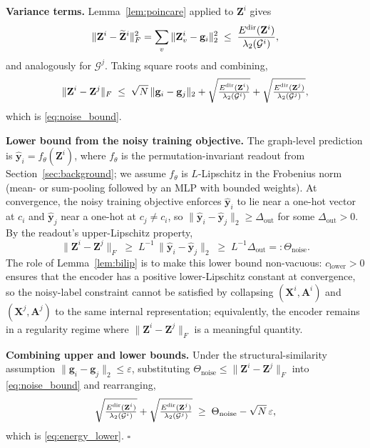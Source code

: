 \textbf{Variance terms.} Lemma~\ref{lem:poincare} applied to $\mathbf{Z}^i$ gives
\begin{equation}
\|\mathbf{Z}^i-\widetilde{\mathbf{Z}}^i\|_F^2=\sum_v\|\mathbf{Z}^i_v-\mathbf{g}_i\|_2^2\;\le\;\frac{E^{\text{dir}}(\mathbf{Z}^i)}{\lambda_2(\mathcal{G}^i)},
\end{equation}
and analogously for $\mathcal{G}^j$. Taking square roots and combining,
\begin{equation}
\|\mathbf{Z}^i-\mathbf{Z}^j\|_F \;\le\; \sqrt{N}\,\|\mathbf{g}_i-\mathbf{g}_j\|_2 + \sqrt{\tfrac{E^{\text{dir}}(\mathbf{Z}^i)}{\lambda_2(\mathcal{G}^i)}}+\sqrt{\tfrac{E^{\text{dir}}(\mathbf{Z}^j)}{\lambda_2(\mathcal{G}^j)}},
\end{equation}
which is \eqref{eq:noise_bound}.

\textbf{Lower bound from the noisy training objective.} The graph-level prediction is $\hat{\mathbf{y}}_i=f_\theta(\mathbf{Z}^i)$, where $f_\theta$ is the permutation-invariant readout from Section~\ref{sec:background}; we assume $f_\theta$ is $L$-Lipschitz in the Frobenius norm (mean- or sum-pooling followed by an MLP with bounded weights). At convergence, the noisy training objective enforces $\hat{\mathbf{y}}_i$ to lie near a one-hot vector at $c_i$ and $\hat{\mathbf{y}}_j$ near a one-hot at $c_j\neq c_i$, so $\|\hat{\mathbf{y}}_i-\hat{\mathbf{y}}_j\|_2\geq\Delta_{\mathrm{out}}$ for some $\Delta_{\mathrm{out}}>0$. By the readout's upper-Lipschitz property,
\begin{equation}
\|\mathbf{Z}^i-\mathbf{Z}^j\|_F\;\geq\;L^{-1}\,\|\hat{\mathbf{y}}_i-\hat{\mathbf{y}}_j\|_2\;\geq\;L^{-1}\Delta_{\mathrm{out}}=:\Theta_{\text{noise}}.
\end{equation}
The role of Lemma~\ref{lem:bilip} is to make this lower bound non-vacuous: $c_{\text{lower}}>0$ ensures that the encoder has a positive lower-Lipschitz constant at convergence, so the noisy-label constraint cannot be satisfied by collapsing $(\mathbf{X}^i,\mathbf{A}^i)$ and $(\mathbf{X}^j,\mathbf{A}^j)$ to the same internal representation; equivalently, the encoder remains in a regularity regime where $\|\mathbf{Z}^i-\mathbf{Z}^j\|_F$ is a meaningful quantity.

\textbf{Combining upper and lower bounds.} Under the structural-similarity assumption $\|\mathbf{g}_i-\mathbf{g}_j\|_2\leq\varepsilon$, substituting $\Theta_{\text{noise}}\leq\|\mathbf{Z}^i-\mathbf{Z}^j\|_F$ into \eqref{eq:noise_bound} and rearranging,
\begin{equation}
\sqrt{\tfrac{E^{\text{dir}}(\mathbf{Z}^i)}{\lambda_2(\mathcal{G}^i)}}+\sqrt{\tfrac{E^{\text{dir}}(\mathbf{Z}^j)}{\lambda_2(\mathcal{G}^j)}}\;\geq\;\Theta_{\text{noise}}-\sqrt{N}\,\varepsilon,
\end{equation}
which is \eqref{eq:energy_lower}. $\square$

